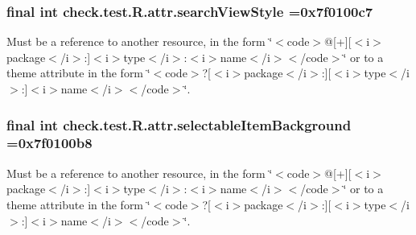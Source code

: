 \subsubsection[{search\+View\+Style}]{\setlength{\rightskip}{0pt plus 5cm}final int check.\+test.\+R.\+attr.\+search\+View\+Style =0x7f0100c7\hspace{0.3cm}{\ttfamily [static]}}\label{classcheck_1_1test_1_1_r_1_1attr_a8569118fa0ad9dc50ad2d3035e843862}
Must be a reference to another resource, in the form \char`\"{}$<$code$>$@\mbox{[}+\mbox{]}\mbox{[}$<$i$>$package$<$/i$>$\+:\mbox{]}$<$i$>$type$<$/i$>$\+:$<$i$>$name$<$/i$>$$<$/code$>$\char`\"{} or to a theme attribute in the form \char`\"{}$<$code$>$?\mbox{[}$<$i$>$package$<$/i$>$\+:\mbox{]}\mbox{[}$<$i$>$type$<$/i$>$\+:\mbox{]}$<$i$>$name$<$/i$>$$<$/code$>$\char`\"{}. \hypertarget{classcheck_1_1test_1_1_r_1_1attr_afdec924c5188046ffd8cdee0a3aa3ca0}{}
\subsubsection[{selectable\+Item\+Background}]{\setlength{\rightskip}{0pt plus 5cm}final int check.\+test.\+R.\+attr.\+selectable\+Item\+Background =0x7f0100b8\hspace{0.3cm}{\ttfamily [static]}}\label{classcheck_1_1test_1_1_r_1_1attr_afdec924c5188046ffd8cdee0a3aa3ca0}
Must be a reference to another resource, in the form \char`\"{}$<$code$>$@\mbox{[}+\mbox{]}\mbox{[}$<$i$>$package$<$/i$>$\+:\mbox{]}$<$i$>$type$<$/i$>$\+:$<$i$>$name$<$/i$>$$<$/code$>$\char`\"{} or to a theme attribute in the form \char`\"{}$<$code$>$?\mbox{[}$<$i$>$package$<$/i$>$\+:\mbox{]}\mbox{[}$<$i$>$type$<$/i$>$\+:\mbox{]}$<$i$>$name$<$/i$>$$<$/code$>$\char`\"{}. \hypertarget{classcheck_1_1test_1_1_r_1_1attr_a62db15ed42075eacd557934728d69a02}{}
